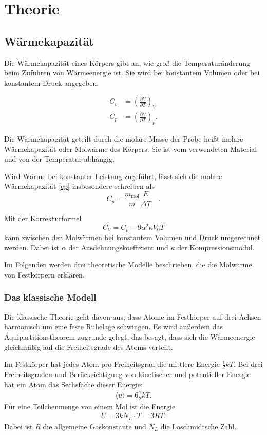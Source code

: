 \section{Theorie}

\subsection{Wärmekapazität}
Die Wärmekapazität eines Körpers gibt an, wie groß die Temperaturänderung beim Zuführen von Wärmeenergie ist.
Sie wird bei konstantem Volumen oder bei konstantem Druck angegeben:

\begin{align}
	C_v &= \left( \frac{\partial U}{\partial T} \right)_V \\
	\label{cp}
	C_p &= \left( \frac{\partial U}{\partial T} \right)_p.
\end{align}

Die Wärmekapazität geteilt durch die molare Masse der Probe heißt molare Wärmekapazität oder Molwärme des Körpers.
Sie ist vom verwendeten Material und von der Temperatur abhängig.

Wird Wärme bei konstanter Leistung zugeführt, lässt sich die molare Wärmekapazität \eqref{cp} insbesondere schreiben als
\begin{equation}
\label{cp_mol}
	C_p=\frac{m_\text{mol}}{m}\frac{E}{\Delta T}\quad.
\end{equation}

Mit der Korrekturformel
\begin{equation}
	\label{kf}
	C_V=C_p-9\alpha^2\kappa V_0T
\end{equation}
kann zwischen den Molwärmen bei konstantem Volumen und Druck umgerechnet werden.
Dabei ist  $\alpha$ der Ausdehnungskoeffizient und $\kappa$ der Kompressionsmodul.

Im Folgenden werden drei theoretische Modelle beschrieben, die die Molwärme von Festkörpern erklären.

\subsubsection{Das klassische Modell}
Die klassische Theorie geht davon aus, dass Atome im Festkörper auf drei Achsen harmonisch um eine feste Ruhelage schwingen.
Es wird außerdem das Äquipartitionstheorem zugrunde gelegt, das besagt, dass sich die Wärmeenergie gleichmäßig auf die Freiheitsgrade des Atoms verteilt.

Im Festkörper hat jedes Atom pro Freiheitsgrad die mittlere Energie $\frac{1}{2}kT$.
Bei drei Freiheitsgraden und Berücksichtigung von kinetischer und potentieller Energie hat ein Atom das Sechsfache dieser Energie:
\begin{align}
	\langle u \rangle = 6\frac{1}{2}kT.
\end{align}
Für eine Teilchenmenge von einem Mol ist die Energie
\begin{align}
	U = 3kN_L \cdot T = 3RT.
\end{align}
Dabei ist $R$ die allgemeine Gaskonstante und $N_L$ die Loschmidtsche Zahl.

